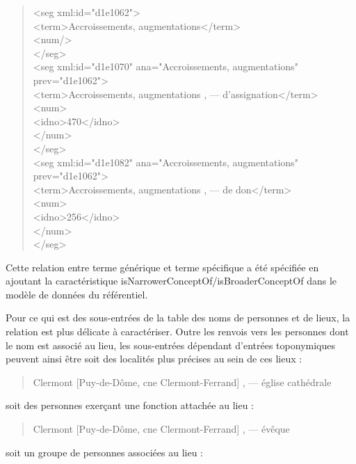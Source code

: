 \documentclass[a4paper,12pt,twoside]{book}
\begin{document}
	\begin{quotation}
		<seg xml:id="d1e1062">\\
		\indent{}Accroissements, augmentations</term>\\
		\indent{}\\
		\\
		\indent<seg xml:id="d1e1070" ana="Accroissements, augmentations" prev="d1e1062">\\
		\indent{}Accroissements, augmentations , — d'assignation</term>\\
		\indent\indent<num>\\
		\indent\indent{}470</idno>\\
		\indent{}\\
		\\
		\indent<seg xml:id="d1e1082" ana="Accroissements, augmentations" prev="d1e1062">\\
		\indent{}Accroissements, augmentations , — de don</term>\\
		\indent\indent<num>\\
		\indent\indent{}256</idno>\\
		\indent{}\\
	\end{quotation}
	
	\noindent Cette relation entre terme générique et terme spécifique a été spécifiée en ajoutant la caractéristique \og isNarrowerConceptOf/isBroaderConceptOf\fg{} dans le modèle de données du référentiel.
	
	Pour ce qui est des sous-entrées de la table des noms de personnes et de lieux, la relation est plus délicate à caractériser. Outre les renvois vers les personnes dont le nom est associé au lieu, les sous-entrées dépendant d'entrées toponymiques peuvent ainsi être soit des localités plus précises au sein de ces lieux :
	
	\begin{quotation}
		Clermont [Puy-de-Dôme, cne Clermont-Ferrand] , — église
		cathédrale
	\end{quotation}
	
	\noindent soit des personnes exerçant une fonction attachée au lieu :
	
	\begin{quotation}
		Clermont [Puy-de-Dôme, cne Clermont-Ferrand] , — évêque
	\end{quotation}

	\noindent soit un groupe de personnes associées au lieu :
	
\end{document}
